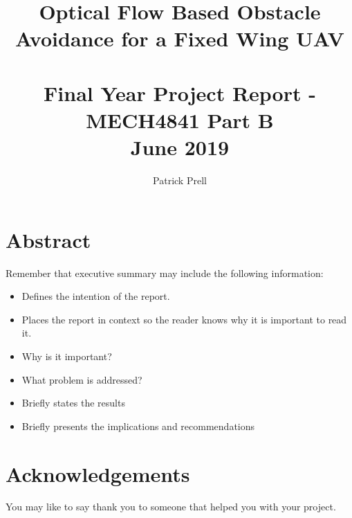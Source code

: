 \documentclass{UoNMCHA}
\numberwithin{equation}{section}
\begin{document}
\title{Optical Flow Based Obstacle Avoidance for a Fixed Wing UAV\\ \ \\
{\small Final Year Project Report - MECH4841 Part B  \\June 2019}}
\author[UoNMCHA]{Patrick Prell}
\address[UoNMCHA]{
Student of Mechatronics Engineering,\\
The University of Newcastle, Callaghan, NSW 2308, AUSTRALIA \\
Student Number: 3204734 \\
E-mail: \href{mailto:Patrick.Prell@uon.edu.au}{\textsf{Patrick.Prell@uon.edu.au}}}
\maketitle
\onecolumn

\vspace{-5mm}
\section*{Abstract}
\vspace{-3mm}
Remember that executive summary may include the following information:
\begin{itemize}
    \item Defines the intention of the report.
    \item Places the report in context so the reader knows why it is important to read it.
    \item Why is it important?
    \item What problem is addressed?
    \item Briefly states the results
    \item Briefly presents the implications and recommendations
\end{itemize}
\vspace{-2mm}
\section*{Acknowledgements}
\vspace{-3mm}
You may like to say thank you to someone that helped you with your project.
\newpage
\tableofcontents
\newpage
\end{document}
